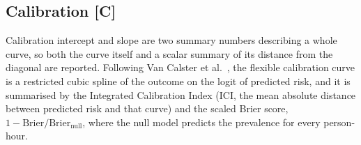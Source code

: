 \subsection{Calibration \texorpdfstring{[C]}{[C]}}

Calibration intercept and slope are two summary numbers describing a whole
curve, so both the curve itself and a scalar summary of its distance from the
diagonal are reported. Following Van Calster et al.\
\cite{vancalster2019calibration}, the flexible calibration curve is a
restricted cubic spline of the outcome on the logit of predicted risk, and it
is summarised by the Integrated Calibration Index (ICI, the mean absolute
distance between predicted risk and that curve) and the scaled Brier score,
$1 - \text{Brier}/\text{Brier}_{\text{null}}$, where the null model predicts
the prevalence for every person-hour.

